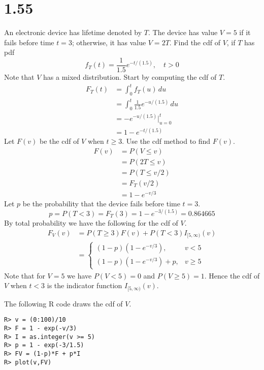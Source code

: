 \section*{1.55}
An electronic device has lifetime denoted by $T$.
The device has value $V=5$ if it fails before time $t=3$;
otherwise, it has value $V=2T$.
Find the cdf of $V$, if $T$ has pdf
\[
f_T(t)=\frac{1}{1.5}e^{-t/(1.5)},\quad t>0
\]
Note that $V$ has
a mixed distribution.
Start by computing the cdf of $T$.
\begin{align*}
F_T(t)&=\int_0^tf_T(u)\,du\\
&=\int_0^t\frac{1}{1.5}e^{-u/(1.5)}\,du\\
&=-e^{-u/(1.5)}\bigg|_{u=0}^t\\
&=1-e^{-t/(1.5)}
\end{align*}
Let $F(v)$ be the cdf of $V$ when $t\ge3$.
Use the cdf method to find $F(v)$.
\begin{align*}
F(v)&=P(V\le v)\\
&=P(2T\le v)\\
&=P(T\le v/2)\\
&=F_T(v/2)\\
&=1-e^{-v/3}
\end{align*}
Let $p$ be the probability that the device fails before time $t=3$.
\[
p=P(T<3)=F_T(3)=1-e^{-3/(1.5)}=0.864665
\]
By total probability we have the following for the cdf of $V$.
\begin{align*}
F_V(v)&=P(T\ge3)F(v)+P(T<3)I_{[5,\infty)}(v)\\
&=\left\{\begin{array}{ll}
(1-p)(1-e^{-v/3}),&v<5\\
(1-p)(1-e^{-v/3})+p,&v\ge5
\end{array}\right.
\end{align*}
Note that for
$V=5$ we have $P(V<5)=0$ and $P(V\ge5)=1$.
Hence the cdf of $V$ when $t<3$ is the indicator function $I_{[5,\infty)}(v)$.

\bigskip
\noindent
The following R code draws the cdf of $V$.

\begin{verbatim}
R> v = (0:100)/10
R> F = 1 - exp(-v/3)
R> I = as.integer(v >= 5)
R> p = 1 - exp(-3/1.5)
R> FV = (1-p)*F + p*I
R> plot(v,FV)
\end{verbatim}

\begin{center}
\end{center}

